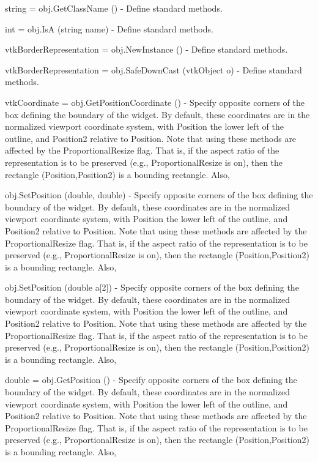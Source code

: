 \begin{DoxyItemize}
\item {\ttfamily string = obj.\-Get\-Class\-Name ()} -\/ Define standard methods.  
\item {\ttfamily int = obj.\-Is\-A (string name)} -\/ Define standard methods.  
\item {\ttfamily vtk\-Border\-Representation = obj.\-New\-Instance ()} -\/ Define standard methods.  
\item {\ttfamily vtk\-Border\-Representation = obj.\-Safe\-Down\-Cast (vtk\-Object o)} -\/ Define standard methods.  
\item {\ttfamily vtk\-Coordinate = obj.\-Get\-Position\-Coordinate ()} -\/ Specify opposite corners of the box defining the boundary of the widget. By default, these coordinates are in the normalized viewport coordinate system, with Position the lower left of the outline, and Position2 relative to Position. Note that using these methods are affected by the Proportional\-Resize flag. That is, if the aspect ratio of the representation is to be preserved (e.\-g., Proportional\-Resize is on), then the rectangle (Position,Position2) is a bounding rectangle. Also,  
\item {\ttfamily obj.\-Set\-Position (double, double)} -\/ Specify opposite corners of the box defining the boundary of the widget. By default, these coordinates are in the normalized viewport coordinate system, with Position the lower left of the outline, and Position2 relative to Position. Note that using these methods are affected by the Proportional\-Resize flag. That is, if the aspect ratio of the representation is to be preserved (e.\-g., Proportional\-Resize is on), then the rectangle (Position,Position2) is a bounding rectangle. Also,  
\item {\ttfamily obj.\-Set\-Position (double a\mbox{[}2\mbox{]})} -\/ Specify opposite corners of the box defining the boundary of the widget. By default, these coordinates are in the normalized viewport coordinate system, with Position the lower left of the outline, and Position2 relative to Position. Note that using these methods are affected by the Proportional\-Resize flag. That is, if the aspect ratio of the representation is to be preserved (e.\-g., Proportional\-Resize is on), then the rectangle (Position,Position2) is a bounding rectangle. Also,  
\item {\ttfamily double = obj.\-Get\-Position ()} -\/ Specify opposite corners of the box defining the boundary of the widget. By default, these coordinates are in the normalized viewport coordinate system, with Position the lower left of the outline, and Position2 relative to Position. Note that using these methods are affected by the Proportional\-Resize flag. That is, if the aspect ratio of the representation is to be preserved (e.\-g., Proportional\-Resize is on), then the rectangle (Position,Position2) is a bounding rectangle. Also,  

\end{DoxyItemize}
